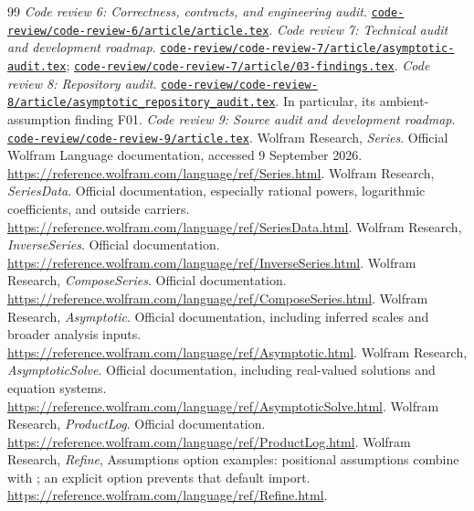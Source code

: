 \documentclass[11pt,a4paper]{article}
\newcommand{\code}[1]{\texttt{\detokenize{#1}}}
\newcommand{\repo}[1]{\href{https://github.com/VladimirReshetnikov/Asymptotic/blob/921387e5ba1239bfda96e63e64e89bf63d9c41e6/#1}{\nolinkurl{#1}}}
\begin{document}
\begin{thebibliography}{99}
 \emph{Code review 6: Correctness, contracts, and engineering audit}. \repo{code-review/code-review-6/article/article.tex}.
 \emph{Code review 7: Technical audit and development roadmap}. \repo{code-review/code-review-7/article/asymptotic-audit.tex}; \repo{code-review/code-review-7/article/03-findings.tex}.
 \emph{Code review 8: Repository audit}. \repo{code-review/code-review-8/article/asymptotic_repository_audit.tex}. In particular, its ambient-assumption finding F01.
 \emph{Code review 9: Source audit and development roadmap}. \repo{code-review/code-review-9/article.tex}.
 Wolfram Research, \emph{Series}. Official Wolfram Language documentation, accessed 9 September 2026. \url{https://reference.wolfram.com/language/ref/Series.html}.
 Wolfram Research, \emph{SeriesData}. Official documentation, especially rational powers, logarithmic coefficients, and outside carriers. \url{https://reference.wolfram.com/language/ref/SeriesData.html}.
 Wolfram Research, \emph{InverseSeries}. Official documentation. \url{https://reference.wolfram.com/language/ref/InverseSeries.html}.
 Wolfram Research, \emph{ComposeSeries}. Official documentation. \url{https://reference.wolfram.com/language/ref/ComposeSeries.html}.
 Wolfram Research, \emph{Asymptotic}. Official documentation, including inferred scales and broader analysis inputs. \url{https://reference.wolfram.com/language/ref/Asymptotic.html}.
 Wolfram Research, \emph{AsymptoticSolve}. Official documentation, including real-valued solutions and equation systems. \url{https://reference.wolfram.com/language/ref/AsymptoticSolve.html}.
 Wolfram Research, \emph{ProductLog}. Official documentation. \url{https://reference.wolfram.com/language/ref/ProductLog.html}.
 Wolfram Research, \emph{Refine}, Assumptions option examples: positional assumptions combine with \code{$Assumptions}; an explicit option prevents that default import. \url{https://reference.wolfram.com/language/ref/Refine.html}.
\end{thebibliography}
\end{document}
